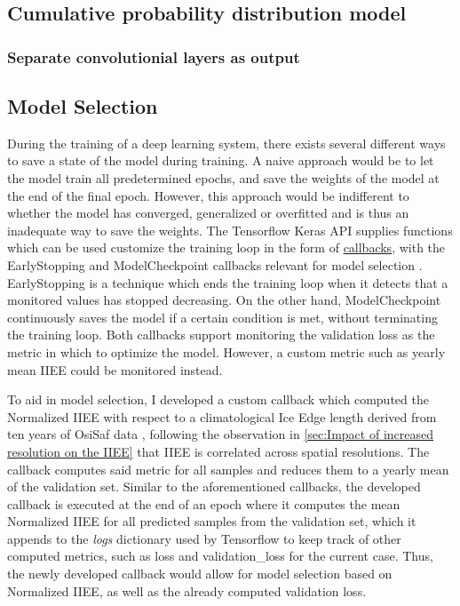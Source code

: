 \documentclass[../main/thesis]{subfiles}
\begin{document}
\subsection{Cumulative probability distribution model}

\subsubsection{Separate convolutionial layers as output}



\subsection{Model Selection}
During the training of a deep learning system, there exists several different ways to save a state of the model during training. A naive approach would be to let the model train all predetermined epochs, and save the weights of the model at the end of the final epoch. However, this approach would be indifferent to whether the model has converged, generalized or overfitted and is thus an inadequate way to save the weights. The Tensorflow Keras API supplies functions which can be used customize the training loop in the form of \href{https://www.tensorflow.org/api_docs/python/tf/keras/callbacks}{callbacks}, with the EarlyStopping and ModelCheckpoint callbacks relevant for model selection \cite{tensorflow2015-whitepaper}. EarlyStopping is a technique which ends the training loop when it detects that a monitored values has stopped decreasing. On the other hand, ModelCheckpoint continuously saves the model if a certain condition is met, without terminating the training loop. Both callbacks support monitoring the validation loss as the metric in which to optimize the model. However, a custom metric such as yearly mean IIEE \cite{Goessling2016} could be monitored instead. 

To aid in model selection, I developed a custom callback which computed the Normalized IIEE with respect to a climatological Ice Edge length derived from ten years of OsiSaf data , following the observation in \ref{sec:Impact of increased resolution on the IIEE} that IIEE is correlated across spatial resolutions. The callback computes said metric for all samples and reduces them to a yearly mean of the validation set. Similar to the aforementioned callbacks, the developed callback is executed at the end of an epoch where it computes the mean Normalized IIEE for all predicted samples from the validation set, which it appends to the \textit{logs} dictionary used by Tensorflow to keep track of other computed metrics, such as loss and validation\_loss for the current case. Thus, the newly developed callback would allow for model selection based on Normalized IIEE, as well as the already computed validation loss.
\end{document}
